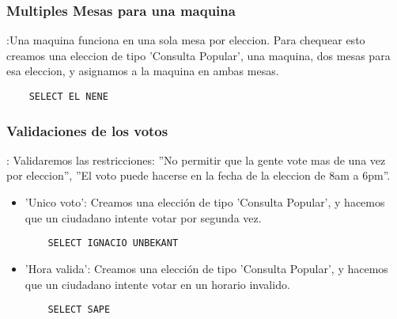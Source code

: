 \begin{enumerate}
\subsubsection{Multiples Mesas para una maquina}:Una maquina funciona en una sola mesa por eleccion. Para chequear esto creamos una eleccion de tipo 'Consulta Popular', una maquina, dos mesas para esa eleccion, y asignamos a la maquina en ambas mesas.
	\begin{lstlisting}
	SELECT EL NENE
	\end{lstlisting}
	
\subsubsection{Validaciones de los votos}: Validaremos las restricciones: ''No permitir que la gente vote mas de una vez por eleccion'', ''El voto puede hacerse en la fecha de la eleccion de 8am a 6pm''. 
	\begin{itemize}
	\item 'Unico voto': Creamos una elección de tipo 'Consulta Popular', y hacemos que un ciudadano intente votar por segunda vez.
	\begin{lstlisting}
	SELECT IGNACIO UNBEKANT
	\end{lstlisting}
	
	\item 'Hora valida': Creamos una elección de tipo 'Consulta Popular', y hacemos que un ciudadano 		intente votar en un horario invalido.
	\begin{lstlisting}
	SELECT SAPE
	\end{lstlisting}	
	
	\end{itemize}					

\end{enumerate}

